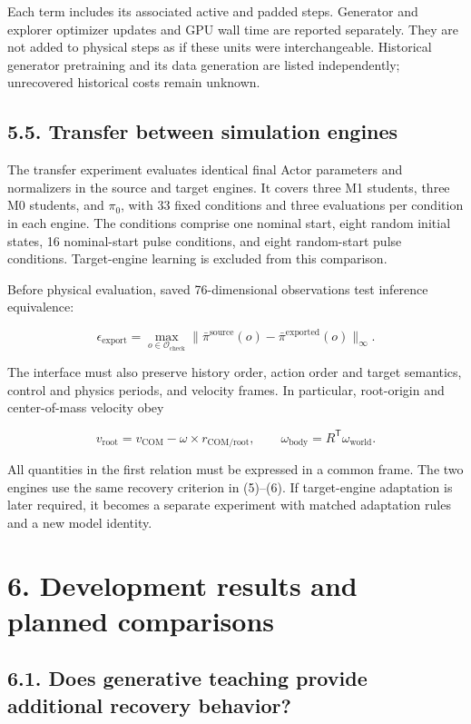 \documentclass[
  american,
  11pt,
  a4paper,
]{article}
\begin{document}
Each term includes its associated active and padded steps. Generator and
explorer optimizer updates and GPU wall time are reported separately.
They are not added to physical steps as if these units were
interchangeable. Historical generator pretraining and its data
generation are listed independently; unrecovered historical costs remain
unknown.

\subsection{5.5. Transfer between simulation
engines}\label{transfer-between-simulation-engines}

The transfer experiment evaluates identical final Actor parameters and
normalizers in the source and target engines. It covers three M1
students, three M0 students, and \(\pi_0\), with 33 fixed conditions and
three evaluations per condition in each engine. The conditions comprise
one nominal start, eight random initial states, 16 nominal-start pulse
conditions, and eight random-start pulse conditions. Target-engine
learning is excluded from this comparison.

Before physical evaluation, saved 76-dimensional observations test
inference equivalence:

\[
\epsilon_{\mathrm{export}}=
\max_{o\in\mathcal O_{\mathrm{check}}}
\|\bar\pi^{\mathrm{source}}(o)-\bar\pi^{\mathrm{exported}}(o)\|_\infty.
\tag{42}\label{eq:42}
\]

The interface must also preserve history order, action order and target
semantics, control and physics periods, and velocity frames. In
particular, root-origin and center-of-mass velocity obey

\[
v_{\mathrm{root}}=v_{\mathrm{COM}}-\omega\times r_{\mathrm{COM/root}},
\qquad
\omega_{\mathrm{body}}=R^{\mathsf T}\omega_{\mathrm{world}}.
\tag{43}\label{eq:43}
\]

All quantities in the first relation must be expressed in a common
frame. The two engines use the same recovery criterion in (5)--(6). If
target-engine adaptation is later required, it becomes a separate
experiment with matched adaptation rules and a new model identity.

\section{6. Development results and planned
comparisons}\label{development-results-and-planned-comparisons}

\subsection{6.1. Does generative teaching provide additional recovery
behavior?}\label{does-generative-teaching-provide-additional-recovery-behavior}
\end{document}
